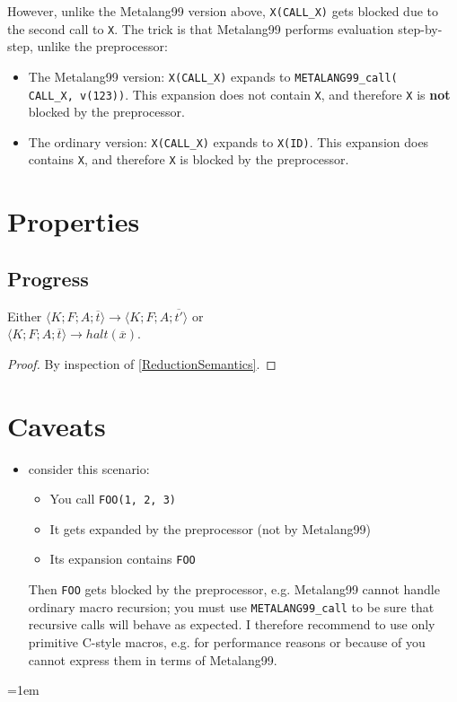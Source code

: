 \documentclass[12pt]{article}
\theoremstyle{break}
\begin{document}
However, unlike the Metalang99 version above, \texttt{X(CALL\_X)} gets blocked \cite{Blueprinting} due to the
second call to \texttt{X}. The trick is that Metalang99 performs evaluation step-by-step,
unlike the preprocessor:

\begin{itemize}
    \item The Metalang99 version: \texttt{X(CALL\_X)} expands to \texttt{METALANG99\_call(\\ CALL\_X, v(123))}.
    This expansion does not contain \texttt{X}, and therefore \texttt{X} is \textbf{not}
    blocked by the preprocessor.

    \item The ordinary version: \texttt{X(CALL\_X)} expands to \texttt{X(ID)}. This expansion
    does contains \texttt{X}, and therefore \texttt{X} is blocked by the preprocessor.
\end{itemize}

\section{Properties}

\subsection{Progress}

\begin{proposition}[Progress]
Either $\langle K; F; A; \overline{t} \rangle \to \langle K; F; A; \overline{t'} \rangle$ or \\
$\langle K; F; A; \overline{t} \rangle \to halt(\overline{x})$.
\end{proposition}

\begin{proof}
By inspection of \ref{ReductionSemantics}.
\end{proof}

\section{Caveats}

\begin{itemize}
\item consider this scenario:
    \begin{itemize}
        \item You call \texttt{FOO(1, 2, 3)}
        \item It gets expanded by the preprocessor (not by Metalang99)
        \item Its expansion contains \texttt{FOO}
    \end{itemize}
Then \texttt{FOO} gets blocked \cite{Blueprinting} by the preprocessor, e.g. Metalang99 cannot handle ordinary
macro recursion; you must use \texttt{METALANG99\_call} to be sure that recursive calls
will behave as expected. I therefore recommend to use only primitive C-style macros, e.g.
for performance reasons or because of you cannot express them in terms of Metalang99.
\end{itemize}

\emergencystretch=1em
\printbibliography
\end{document}
